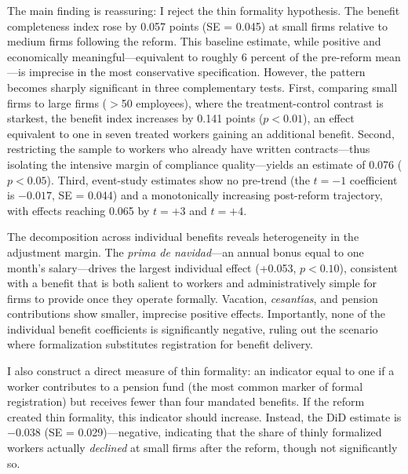 \documentclass[12pt]{article}
\begin{document}
The main finding is reassuring: I reject the thin formality hypothesis. The benefit completeness index rose by 0.057 points (SE = 0.045) at small firms relative to medium firms following the reform. This baseline estimate, while positive and economically meaningful---equivalent to roughly 6 percent of the pre-reform mean---is imprecise in the most conservative specification. However, the pattern becomes sharply significant in three complementary tests. First, comparing small firms to large firms ($>$50 employees), where the treatment-control contrast is starkest, the benefit index increases by 0.141 points ($p<0.01$), an effect equivalent to one in seven treated workers gaining an additional benefit. Second, restricting the sample to workers who already have written contracts---thus isolating the intensive margin of compliance quality---yields an estimate of 0.076 ($p<0.05$). Third, event-study estimates show no pre-trend (the $t=-1$ coefficient is $-0.017$, SE = 0.044) and a monotonically increasing post-reform trajectory, with effects reaching 0.065 by $t=+3$ and $t=+4$.

The decomposition across individual benefits reveals heterogeneity in the adjustment margin. The \textit{prima de navidad}---an annual bonus equal to one month's salary---drives the largest individual effect (+0.053, $p<0.10$), consistent with a benefit that is both salient to workers and administratively simple for firms to provide once they operate formally. Vacation, \textit{cesant\'{\i}as}, and pension contributions show smaller, imprecise positive effects. Importantly, none of the individual benefit coefficients is significantly negative, ruling out the scenario where formalization substitutes registration for benefit delivery.

I also construct a direct measure of thin formality: an indicator equal to one if a worker contributes to a pension fund (the most common marker of formal registration) but receives fewer than four mandated benefits. If the reform created thin formality, this indicator should increase. Instead, the DiD estimate is $-0.038$ (SE = 0.029)---negative, indicating that the share of thinly formalized workers actually \textit{declined} at small firms after the reform, though not significantly so.
\end{document}
